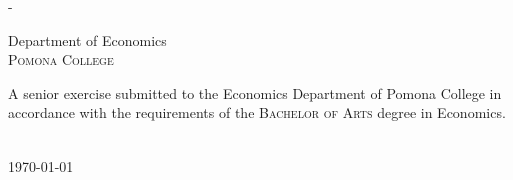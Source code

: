 \begin{titlingpage}
\begin{SingleSpace}
\begin{adjustwidth*}{\unitlength}{-\unitlength}
\begin{center}
\vspace{6mm}
{\large Department of Economics\\
\textsc{Pomona College}}\\
\vspace{11mm}
\begin{minipage}{10cm}
A senior exercise submitted to the Economics Department of Pomona College in accordance with the requirements of the \textsc{Bachelor of Arts} degree in Economics.
\end{minipage}\\
\vspace{9mm}
{\large\textsc{\today}}
\vspace{12mm}
\end{center}
\end{adjustwidth*}
\end{SingleSpace}
\end{titlingpage}